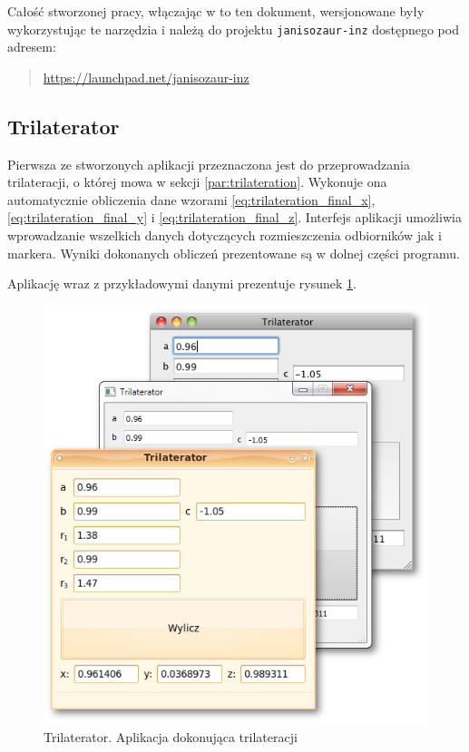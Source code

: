 Całość stworzonej pracy, włączając w to ten dokument, wersjonowane były wykorzystując te narzędzia i należą do projektu \texttt{janisozaur-inz} dostępnego pod adresem:
\begin{verse}
  \url{https://launchpad.net/janisozaur-inz}
\end{verse}

\subsection{Trilaterator}
Pierwsza ze stworzonych aplikacji przeznaczona jest do przeprowadzania trilateracji, o której mowa w sekcji \ref{par:trilateration}. Wykonuje ona automatycznie obliczenia dane wzorami \ref{eq:trilateration_final_x}, \ref{eq:trilateration_final_y} i \ref{eq:trilateration_final_z}. Interfejs aplikacji umożliwia wprowadzanie wszelkich danych dotyczących rozmieszczenia odbiorników jak i markera. Wyniki dokonanych obliczeń prezentowane są w dolnej części programu.

Aplikację wraz z przykładowymi danymi prezentuje rysunek \ref{fig:trilaterator}.

\begin{figure}[t]
 \includegraphics[width=\textwidth]{gfx/trilaterator_triple.png}
 \caption{Trilaterator. Aplikacja dokonująca trilateracji}
 \label{fig:trilaterator}
\end{figure}

